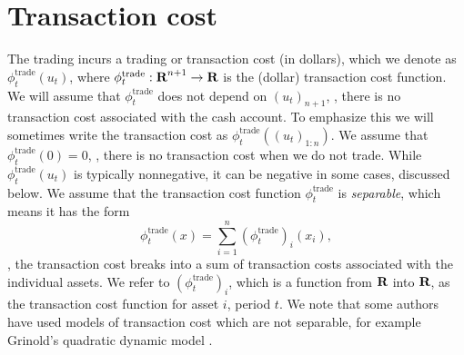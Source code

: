 \documentclass[openany]{article}  %
\newcommand{\trcost}{\phi^\mathrm{trade}}
\begin{document}
\section{Transaction cost}
The trading incurs a trading or transaction cost (in dollars), which we denote as $\trcost_t(u_t)$,
where $\trcost_t: \reals^{n+1} \to \reals$ is the (dollar) transaction cost function.
We will assume that $\trcost_t$ does not depend on $(u_t)_{n+1}$, \ie,
there is no transaction cost associated with the cash account.
To emphasize this we will sometimes write the transaction cost as
$\trcost_t((u_t)_{1:n})$.
We assume that $\trcost_t(0)=0$, \ie,
there is no transaction cost when we do not trade.
While $\trcost_t(u_t)$ is typically nonnegative, it can be negative in some cases,
discussed below.
We assume that the transaction cost function $\trcost_t$ is \emph{separable},
which means it has the form
\[
\trcost_t(x) = \sum_{i=1}^n (\trcost_t)_i(x_i),
\]
\ie, the transaction cost breaks into a sum of transaction costs
associated with the individual assets.
We refer to $(\trcost_t)_i$, which is a function from ${\mbox{\bf R}}$ into ${\mbox{\bf R}}$,
as the transaction cost function for asset $i$, period $t$.
We note that some authors have used models of transaction cost which are
not separable, for example Grinold's quadratic dynamic
model \cite{grinold2006dynamic}.
\end{document}

